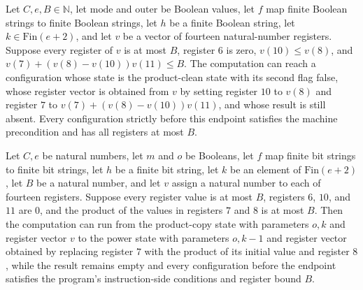 \begin{lemma}
\label{Complexity.comp_product}
\leanok
{}
Let $C,e,B\in\mathbb{N}$, let $\mathrm{mode}$ and $\mathrm{outer}$ be Boolean values,
let $f$ map finite Boolean strings to finite Boolean strings, let $h$ be a finite
Boolean string, let $k\in\mathrm{Fin}(e+2)$, and let $v$ be a vector of fourteen
natural-number registers. Suppose every register of $v$ is at most $B$, register $6$ is
zero, $v(10)\le v(8)$, and $v(7)+(v(8)-v(10))v(11)\le B$. The computation can reach a
configuration whose state is the product-clean state with its second flag false, whose
register vector is obtained from $v$ by setting register $10$ to $v(8)$ and register $7$
to $v(7)+(v(8)-v(10))v(11)$, and whose result is still absent. Every configuration
strictly before this endpoint satisfies the machine precondition and has all registers
at most $B$.
\end{lemma}

\begin{lemma}
\label{Complexity.comp_multiply}
\leanok
{}
Let $C,e$ be natural numbers, let $m$ and $o$ be Booleans, let $f$ map finite bit
strings to finite bit strings, let $h$ be a finite bit string, let $k$ be an element of
$\text{Fin}(e+2)$, let $B$ be a natural number, and let $v$ assign a natural number to
each of fourteen registers. Suppose every register value is at most $B$, registers $6$,
$10$, and $11$ are $0$, and the product of the values in registers $7$ and $8$ is at
most $B$. Then the computation can run from the product-copy state with parameters $o,k$
and register vector $v$ to the power state with parameters $o,k-1$ and register vector
obtained by replacing register $7$ with the product of its initial value and register
$8$, while the result remains empty and every configuration before the endpoint
satisfies the program’s instruction-side conditions and register bound $B$.
\end{lemma}

